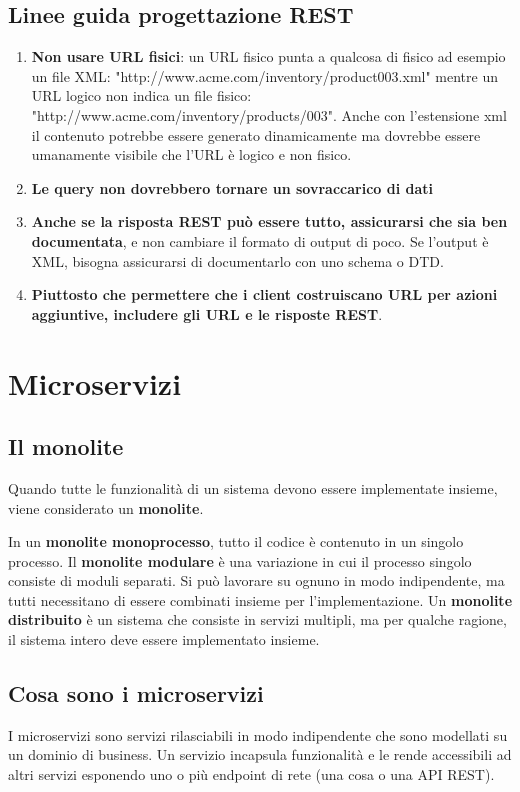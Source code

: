 \section{Linee guida progettazione REST}
\begin{enumerate}
    \item \textbf{Non usare URL fisici}: un URL fisico punta a qualcosa di fisico ad esempio un file XML: "http://www.acme.com/inventory/product003.xml" mentre un URL logico non indica un file fisico: "http://www.acme.com/inventory/products/003". Anche con l'estensione xml il contenuto potrebbe essere generato dinamicamente ma dovrebbe essere umanamente visibile che l'URL è logico e non fisico.
    
    \item \textbf{Le query non dovrebbero tornare un sovraccarico di dati}
    \item \textbf{Anche se la risposta REST può essere tutto, assicurarsi che sia ben documentata}, e non cambiare il formato di output di poco. Se l'output è XML, bisogna assicurarsi di documentarlo con uno schema o DTD.
    \item \textbf{Piuttosto che permettere che i client costruiscano URL per azioni aggiuntive, includere gli URL e le risposte REST}. 
\end{enumerate}


\chapter{Microservizi}
\section{Il monolite}
Quando tutte le funzionalità di un sistema devono essere implementate insieme, viene considerato un \textbf{monolite}.

In un \textbf{monolite monoprocesso}, tutto il codice è contenuto in un singolo processo. Il \textbf{monolite modulare} è una variazione in cui il processo singolo consiste di moduli separati. Si può lavorare su ognuno in modo indipendente, ma tutti necessitano di essere combinati insieme per l'implementazione. Un \textbf{monolite distribuito} è un sistema che consiste in servizi multipli, ma per qualche ragione, il sistema intero deve essere implementato insieme.


\section{Cosa sono i microservizi}
I microservizi sono servizi rilasciabili in modo indipendente che sono modellati su un dominio di business. Un servizio incapsula funzionalità e le rende accessibili ad altri servizi esponendo uno o più endpoint di rete (una cosa o una API REST).


